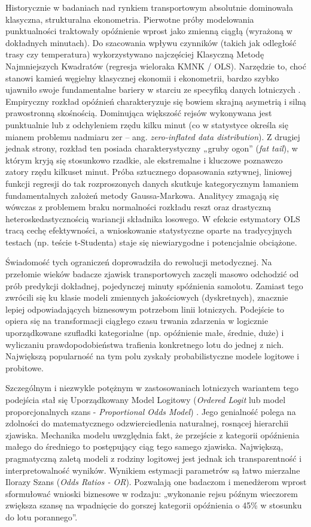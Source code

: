 Historycznie w badaniach nad rynkiem transportowym absolutnie dominowała klasyczna, strukturalna ekonometria. Pierwotne próby modelowania punktualności traktowały opóźnienie wprost jako zmienną ciągłą (wyrażoną w dokładnych minutach). Do szacowania wpływu czynników (takich jak odległość trasy czy temperatura) wykorzystywano najczęściej Klasyczną Metodę Najmniejszych Kwadratów (regresja wieloraka KMNK / OLS). Narzędzie to, choć stanowi kamień węgielny klasycznej ekonomii i ekonometrii, bardzo szybko ujawniło swoje fundamentalne bariery w starciu ze specyfiką danych lotniczych \cite{greene2003}. Empiryczny rozkład opóźnień charakteryzuje się bowiem skrajną asymetrią i silną prawostronną skośnością. Dominująca większość rejsów wykonywana jest punktualnie lub z odchyleniem rzędu kilku minut (co w statystyce określa się mianem problemu nadmiaru zer – ang. \textit{zero-inflated data distribution}). Z drugiej jednak strony, rozkład ten posiada charakterystyczny „gruby ogon” (\textit{fat tail}), w którym kryją się stosunkowo rzadkie, ale ekstremalne i kluczowe poznawczo zatory rzędu kilkuset minut. Próba sztucznego dopasowania sztywnej, liniowej funkcji regresji do tak rozproszonych danych skutkuje kategorycznym łamaniem fundamentalnych założeń metody Gaussa-Markowa. Analitycy zmagają się wówczas z problemem braku normalności rozkładu reszt oraz drastyczną heteroskedastycznością wariancji składnika losowego. W efekcie estymatory OLS tracą cechę efektywności, a wnioskowanie statystyczne oparte na tradycyjnych testach (np. teście t-Studenta) staje się niewiarygodne i potencjalnie obciążone.

Świadomość tych ograniczeń doprowadziła do rewolucji metodycznej. Na przełomie wieków badacze zjawisk transportowych zaczęli masowo odchodzić od prób predykcji dokładnej, pojedynczej minuty spóźnienia samolotu. Zamiast tego zwrócili się ku klasie modeli zmiennych jakościowych (dyskretnych), znacznie lepiej odpowiadających biznesowym potrzebom linii lotniczych. Podejście to opiera się na transformacji ciągłego czasu trwania zdarzenia w logicznie uporządkowane szufladki kategorialne (np. opóźnienie małe, średnie, duże) i wyliczaniu prawdopodobieństwa trafienia konkretnego lotu do jednej z nich. Największą popularność na tym polu zyskały probabilistyczne modele logitowe i probitowe. 

Szczególnym i niezwykle potężnym w zastosowaniach lotniczych wariantem tego podejścia stał się Uporządkowany Model Logitowy (\textit{Ordered Logit} lub model proporcjonalnych szans - \textit{Proportional Odds Model}) \cite{greene2003}. Jego genialność polega na zdolności do matematycznego odzwierciedlenia naturalnej, rosnącej hierarchii zjawiska. Mechanika modelu uwzględnia fakt, że przejście z kategorii opóźnienia małego do średniego to postępujący ciąg tego samego zjawiska. Największą, pragmatyczną zaletą modeli z rodziny logitowej jest jednak ich transparentność i interpretowalność wyników. Wynikiem estymacji parametrów są łatwo mierzalne Ilorazy Szans (\textit{Odds Ratios - OR}). Pozwalają one badaczom i menedżerom wprost sformułować wnioski biznesowe w rodzaju: „wykonanie rejsu późnym wieczorem zwiększa szansę na wpadnięcie do gorszej kategorii opóźnienia o 45\% w stosunku do lotu porannego”. 

